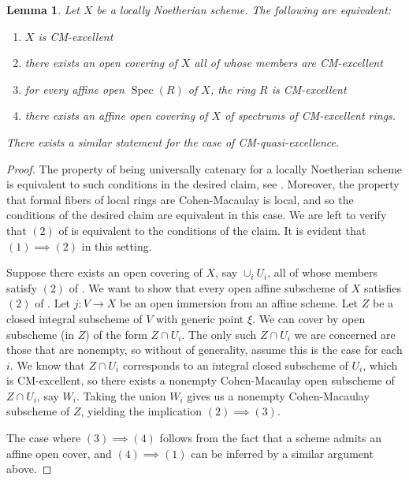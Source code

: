 \documentclass[11pt]{amsart}
\theoremstyle{plain}
\newtheorem{lemma}[theorem]{Lemma}
\theoremstyle{definition}
\numberwithin{equation}{section}
\numberwithin{theorem}{section}
\begin{document}
\begin{lemma}\label{lem:cm_excellent_covering}
    Let $X$ be a locally Noetherian scheme. The following are equivalent:
    \begin{enumerate}
        \item $X$ is CM-excellent
        \item there exists an open covering of $X$ all of whose members are CM-excellent
        \item for every affine open $\operatorname{Spec}(R)$ of $X$, the ring $R$ is CM-excellent
        \item there exists an affine open covering of $X$ of spectrums of  CM-excellent rings.
    \end{enumerate}
    There exists a similar statement for the case of CM-quasi-excellence.
\end{lemma}

\begin{proof}
    The property of being universally catenary for a locally Noetherian scheme is equivalent to such conditions in the desired claim, see \cite[\href{https://stacks.math.columbia.edu/tag/02J9}{Tag 02J9}]{StacksProject}. Moreover, the property that formal fibers of local rings are Cohen-Macaulay is local, and so the conditions of the desired claim are equivalent in this case. We are left to verify that $(2)$ of  is equivalent to the conditions of the claim. It is evident that $(1)\implies (2)$ in this setting.

    Suppose there exists an open covering of $X$, say $\cup_i U_i$, all of whose members satisfy $(2)$ of . We want to show that every open affine subscheme of $X$ satisfies $(2)$ of . Let $j \colon V \to X$ be an open immersion from an affine scheme. Let $Z$ be a closed integral subscheme of $V$ with generic point $\xi$. We can cover by open subscheme (in $Z$) of the form $Z \cap U_i$. The only such $Z\cap U_i$ we are concerned are those that are nonempty, so without of generality, assume this is the case for each $i$. We know that $Z\cap U_i$ corresponds to an integral closed subscheme of $U_i$, which is CM-excellent, so there exists a nonempty Cohen-Macaulay open subscheme of $Z \cap U_i$, say $W_i$. Taking the union $W_i$ gives us a nonempty Cohen-Macaulay subscheme of $Z$, yielding the implication $(2)\implies (3)$.
    
    The case where $(3)\implies (4)$ follows from the fact that a scheme admits an affine open cover, and $(4)\implies (1)$ can be inferred by a similar argument above.
\end{proof}
\end{document}
